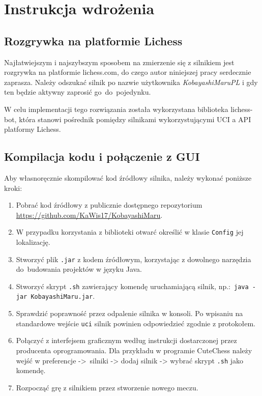 \chapter{Instrukcja wdrożenia}
\label{ch:instrukcja-wdrozenia}

\section{Rozgrywka na platformie Lichess}
\label{sec:rozgrywka-na-platformie-lichess}
Najłatwiejszym i najszybszym sposobem na zmierzenie się z silnikiem jest rozgrywka na platformie lichess.com, do czego autor niniejszej pracy serdecznie zaprasza.
Należy odszukać silnik po nazwie użytkownika \textit{KobayashiMaruPL} i gdy ten będzie aktywny zaprosić go~do~pojedynku.

W celu implementacji tego rozwiązania została wykorzystana biblioteka lichess-bot, która stanowi pośrednik pomiędzy silnikami wykorzystującymi UCI a API platformy Lichess. \cite{lichess-bot-docs}

\section{Kompilacja kodu i połączenie z GUI}
\label{sec:kompilacja-kodu-i-polaczenie-z-gui}

Aby własnoręcznie skompilować kod źródłowy silnika, należy wykonać poniższe kroki:
\begin{enumerate}
    \item Pobrać kod źródłowy z publicznie dostępnego repozytorium \url{https://github.com/KaWis17/KobayashiMaru}.
    \item W przypadku korzystania z biblioteki otwarć określić w klasie \texttt{Config} jej lokalizację.
    \item Stworzyć plik \texttt{.jar} z kodem źródłowym, korzystając z dowolnego narzędzia do~budowania projektów w języku Java.
    \item Stworzyć skrypt \texttt{.sh} zawierający komendę uruchamiającą silnik, np.:~\texttt{java~-jar~KobayashiMaru.jar}.
    \item Sprawdzić poprawność przez odpalenie silnika w konsoli.
    Po wpisaniu na standardowe wejście \texttt{uci} silnik powinien odpowiedzieć zgodnie z protokołem.
    \item Połączyć z interfejsem graficznym według instrukcji dostarczonej przez producenta oprogramowania.
    Dla przykładu w programie CuteChess należy wejść w preferencje ->~silniki -> dodaj silnik -> wybrać skrypt \texttt{.sh} jako komendę.
    \item Rozpocząć grę z silnikiem przez stworzenie nowego meczu.
\end{enumerate}

